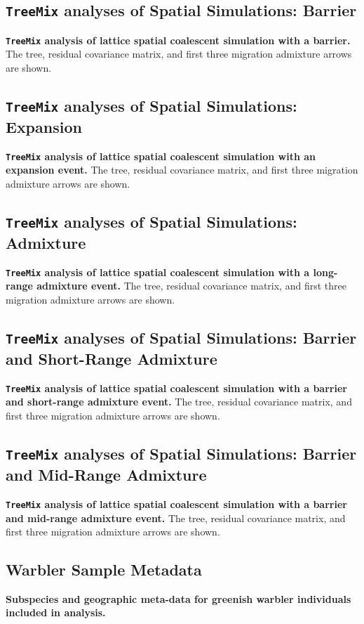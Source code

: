 \documentclass[10pt,letterpaper]{article}
\begin{document}
\subsection*{\texttt{TreeMix} analyses of Spatial Simulations: Barrier}
\label{treemix_barrier}
{\bf{\texttt{TreeMix} analysis of lattice spatial coalescent simulation with a barrier.}}
The tree, residual covariance matrix, and first three migration admixture arrows are shown.

\subsection*{\texttt{TreeMix} analyses of Spatial Simulations: Expansion}
\label{treemix_expansion}
{\bf{\texttt{TreeMix} analysis of lattice spatial coalescent simulation with an expansion event.}}
The tree, residual covariance matrix, and first three migration admixture arrows are shown.

\subsection*{\texttt{TreeMix} analyses of Spatial Simulations: Admixture}
\label{treemix_corneradmixture}
{\bf{\texttt{TreeMix} analysis of lattice spatial coalescent simulation with a long-range admixture event.}}
The tree, residual covariance matrix, and first three migration admixture arrows are shown.

\subsection*{\texttt{TreeMix} analyses of Spatial Simulations: Barrier and Short-Range Admixture}
\label{treemix_neighboradmixture}
{\bf{\texttt{TreeMix} analysis of lattice spatial coalescent simulation with a barrier and short-range admixture event.}}  
The tree, residual covariance matrix, and first three migration admixture arrows are shown.

\subsection*{\texttt{TreeMix} analyses of Spatial Simulations: Barrier and Mid-Range Admixture}
\label{treemix_inlandadmixture}
{\bf{\texttt{TreeMix} analysis of lattice spatial coalescent simulation with a barrier and mid-range admixture event.}}  
The tree, residual covariance matrix, and first three migration admixture arrows are shown.

\subsection*{Warbler Sample Metadata}
\label{warbler_data_table}
{\bf{Subspecies and geographic meta-data for greenish warbler individuals included in analysis.}}
\end{document}
